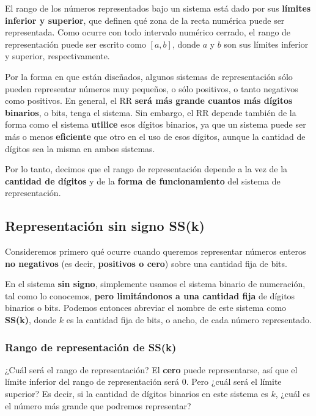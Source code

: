 \documentclass[spanish,a4paper,]{article}
\begin{document}
El rango de los números representados bajo un sistema está dado por sus
\textbf{límites inferior y superior}, que definen qué zona de la recta
numérica puede ser representada. Como ocurre con todo intervalo numérico
cerrado, el rango de representación puede ser escrito como \([a, b]\),
donde \(a\) y \(b\) son sus límites inferior y superior,
respectivamente.

Por la forma en que están diseñados, algunos sistemas de representación
sólo pueden representar números muy pequeños, o sólo positivos, o tanto
negativos como positivos. En general, el RR \textbf{será más grande
cuantos más dígitos binarios}, o bits, tenga el sistema. Sin embargo, el
RR depende también de la forma como el sistema \textbf{utilice} esos
dígitos binarios, ya que un sistema puede ser más o menos
\textbf{eficiente} que otro en el uso de esos dígitos, aunque la
cantidad de dígitos sea la misma en ambos sistemas.

Por lo tanto, decimos que el rango de representación depende a la vez de
la \textbf{cantidad de dígitos} y de la \textbf{forma de funcionamiento}
del sistema de representación.

\hypertarget{representaciuxf3n-sin-signo-ssk}{%
\subsection{Representación sin signo
SS(k)}\label{representaciuxf3n-sin-signo-ssk}}

Consideremos primero qué ocurre cuando queremos representar números
enteros \textbf{no negativos} (es decir, \textbf{positivos o cero})
sobre una cantidad fija de bits.

En el sistema \textbf{sin signo}, simplemente usamos el sistema binario
de numeración, tal como lo conocemos, \textbf{pero limitándonos a una
cantidad fija} de dígitos binarios o bits. Podemos entonces abreviar el
nombre de este sistema como \textbf{SS(k)}, donde \(k\) es la cantidad
fija de bits, o ancho, de cada número representado.

\hypertarget{rango-de-representaciuxf3n-de-ssk}{%
\subsubsection{Rango de representación de
SS(k)}\label{rango-de-representaciuxf3n-de-ssk}}

¿Cuál será el rango de representación? El \textbf{cero} puede
representarse, así que el límite inferior del rango de representación
será 0. Pero ¿cuál será el límite superior? Es decir, si la cantidad de
dígitos binarios en este sistema es \(k\), ¿cuál es el número más grande
que podremos representar?
\end{document}
